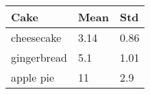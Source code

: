 
\begin{tabu} spread 0pt {X[l] *{2}{X[c]}}
	\toprule
	Cake        & Mean       & Std        \\
	\midrule
	cheesecake  & \num{3.14} & \num{0.86} \\
	gingerbread & \num{5.1}  & \num{1.01} \\
	apple pie   & \num{11}   & \num{2.9}  \\
	\bottomrule
\end{tabu}
